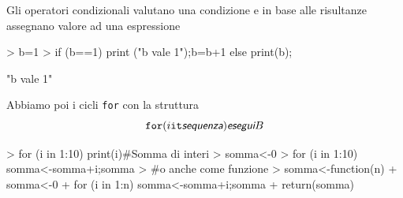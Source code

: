 \documentclass[onecolumn,11pt]{book}
\newcommand{\varia}[1]{\textsl{\textsf{#1}}}
\begin{document}
Gli operatori condizionali valutano una condizione e in base alle risultanze assegnano valore ad una espressione

\begin{Schunk}
\begin{Sinput}
> b=1
> if (b==1) {print ("b vale 1");b=b+1}  else print(b);
\end{Sinput}
\begin{Soutput}
[1] "b vale 1"
\end{Soutput}
\end{Schunk}
 
Abbiamo poi i cicli \texttt{for} con la struttura 
\begin{equation*}
\texttt{for} (i \texttt{it} \varia{sequenza}) \varia{esegui} B
\end{equation*}

\begin{Schunk}
\begin{Sinput}
> for (i in 1:10) print(i)#Somma di interi
> somma<-0
> for (i in  1:10) somma<-somma+i;somma
> #o anche come funzione
> somma<-function(n)
+ {somma<-0
+ for (i in  1:n) somma<-somma+i;somma
+ return(somma)}
\end{Sinput}
\end{Schunk}

 
\end{document}
